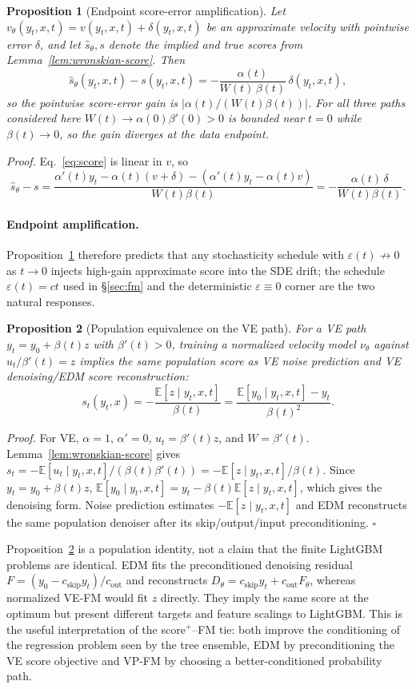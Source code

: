 \documentclass{tpm2026}
\newcommand{\E}{\mathbb{E}}
\newtheorem{proposition}{Proposition}
\begin{document}
\begin{proposition}[Endpoint score-error amplification]\label{prop:endpoint-amp}
Let $v_\theta(y_t,x,t)=v(y_t,x,t)+\delta(y_t,x,t)$ be an approximate velocity with pointwise error $\delta$, and let $\hat s_\theta,s$ denote the implied and true scores from Lemma~\ref{lem:wronskian-score}. Then
\[
\hat s_\theta(y_t,x,t)-s(y_t,x,t)=-\frac{\alpha(t)}{W(t)\,\beta(t)}\,\delta(y_t,x,t),
\]
so the pointwise score-error gain is $|\alpha(t)/(W(t)\beta(t))|$. For all three paths considered here $W(t)\to\alpha(0)\beta'(0)>0$ is bounded near $t=0$ while $\beta(t)\to 0$, so the gain diverges at the data endpoint.
\end{proposition}
\emph{Proof.} Eq.~\eqref{eq:score} is linear in $v$, so
\[
\hat s_\theta - s
=\frac{\alpha'(t)y_t-\alpha(t)(v+\delta)-(\alpha'(t)y_t-\alpha(t)v)}{W(t)\beta(t)}
=-\frac{\alpha(t)\,\delta}{W(t)\beta(t)}. \tag*{$\square$}
\]

\paragraph{Endpoint amplification.} Proposition~\ref{prop:endpoint-amp} therefore predicts that any stochasticity schedule with $\varepsilon(t)\not\to 0$ as $t\to 0$ injects high-gain approximate score into the SDE drift; the schedule $\varepsilon(t)=ct$ used in \S\ref{sec:fm} and the deterministic $\varepsilon\equiv 0$ corner are the two natural responses.

\begin{proposition}[Population equivalence on the VE path]\label{prop:ve-equivalence}
For a VE path $y_t=y_0+\beta(t)z$ with $\beta'(t)>0$, training a normalized velocity model $\nu_\theta$ against $u_t/\beta'(t)=z$ implies the same population score as VE noise prediction and VE denoising/EDM score reconstruction:
\[
s_t(y_t,x)=-\frac{\E[z\mid y_t,x,t]}{\beta(t)}
          =\frac{\E[y_0\mid y_t,x,t]-y_t}{\beta(t)^2}.
\]
\end{proposition}
\emph{Proof.} For VE, $\alpha=1$, $\alpha'=0$, $u_t=\beta'(t)z$, and $W=\beta'(t)$. Lemma~\ref{lem:wronskian-score} gives $s_t=-\E[u_t\mid y_t,x,t]/(\beta(t)\beta'(t))=-\E[z\mid y_t,x,t]/\beta(t)$. Since $y_t=y_0+\beta(t)z$, $\E[y_0\mid y_t,x,t]=y_t-\beta(t)\E[z\mid y_t,x,t]$, which gives the denoising form. Noise prediction estimates $-\E[z\mid y_t,x,t]$ and EDM reconstructs the same population denoiser after its skip/output/input preconditioning. \hfill$\square$

Proposition~\ref{prop:ve-equivalence} is a population identity, not a claim that the finite LightGBM problems are identical. EDM fits the preconditioned denoising residual $F=(y_0-c_{\mathrm{skip}}y_t)/c_{\mathrm{out}}$ and reconstructs $D_\theta=c_{\mathrm{skip}}y_t+c_{\mathrm{out}}F_\theta$, whereas normalized VE-FM would fit $z$ directly. They imply the same score at the optimum but present different targets and feature scalings to LightGBM. This is the useful interpretation of the score$^+$--FM tie: both improve the conditioning of the regression problem seen by the tree ensemble, EDM by preconditioning the VE score objective and VP-FM by choosing a better-conditioned probability path.
\end{document}
